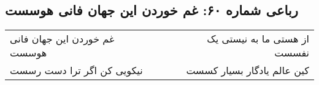 \begin{center}
\section*{رباعی شماره ۶۰: غم خوردن این جهان فانی هوسست}
\label{sec:sh060}
\begin{longtable}{l p{0.5cm} r}
غم خوردن این جهان فانی هوسست
&&
از هستی ما به نیستی یک نفسست
\\
نیکویی کن اگر ترا دست رسست
&&
کین عالم یادگار بسیار کسست
\\
\end{longtable}
\end{center}
